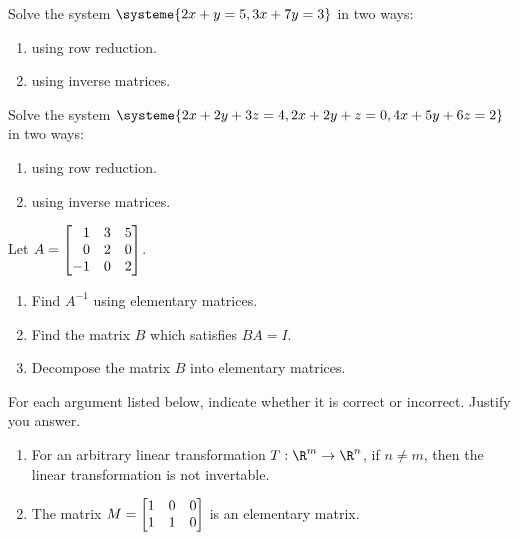 \begin{exercises}
\begin{problist}
		\prob Solve the system $\systeme{2x+y=5,3x+7y=3}$ in two ways:
		    \begin{enumerate}
		        \item   using row reduction.
		        \item   using inverse matrices.
		    \end{enumerate}
		
		\prob Solve the system $\systeme{2x+2y+3z=4,2x+2y+z=0, 4x+5y+6z=2}$ in two ways:
		    \begin{enumerate}
		        \item   using row reduction.
		        \item   using inverse matrices.
		    \end{enumerate}
		    
		\prob 	Let $A=\mat{1&3&5\\0&2&0\\-1&0&2}$. 
		    \begin{enumerate}
		        \item Find $A^{-1}$ using elementary matrices.
		        \item Find the matrix $B$ which satisfies $BA=I$.
		        \item Decompose the matrix $B$ into elementary matrices. 
		    \end{enumerate}  
	
		\prob For each argument listed below, indicate whether it is correct or incorrect. Justify you answer.
            \begin{enumerate}
                \item   For an  arbitrary linear transformation $T:\R^m\to\R^n$, if $n \neq m$, then the linear transformation is not invertable. 
                \item   The matrix $M = \mat{1&0&0\\1&1&0}$ is an elementary matrix.
            \end{enumerate}
		
	\end{problist}
\end{exercises}
